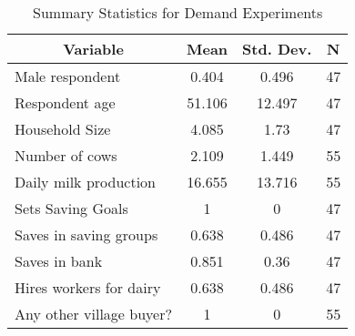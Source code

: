 
\begin{table}[htbp]\centering \caption{Summary Statistics for Demand Experiments \label{tab-sum-stats}}
\begin{tabular}{l c c  c}\hline\hline
\multicolumn{1}{c}{\textbf{Variable}} & \textbf{Mean}
 & \textbf{Std. Dev.} & \textbf{N}\\ \hline
Male respondent & 0.404 & 0.496  & 47\\
Respondent age & 51.106 & 12.497  & 47\\
Household Size & 4.085 & 1.73  & 47\\
Number of cows & 2.109 & 1.449  & 55\\
Daily milk production & 16.655 & 13.716  & 55\\
Sets Saving Goals & 1 & 0  & 47\\
Saves in saving groups & 0.638 & 0.486  & 47\\
Saves in bank & 0.851 & 0.36  & 47\\
Hires workers for dairy & 0.638 & 0.486  & 47\\
Any other village buyer? & 1 & 0  & 55\\
\hline\end{tabular}
\end{table}
